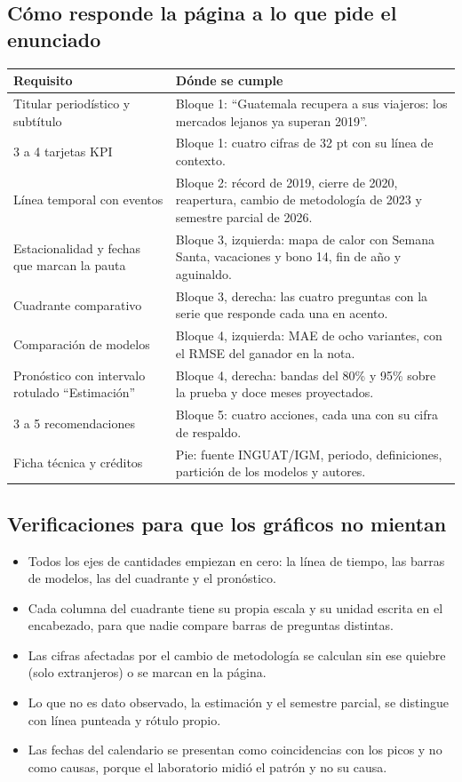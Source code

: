 \subsection{Cómo responde la página a lo que pide el enunciado}

\begin{center}
\begin{tabularx}{\textwidth}{@{}lX@{}}
\toprule
Requisito & Dónde se cumple \\
\midrule
Titular periodístico y subtítulo & Bloque 1: ``Guatemala recupera a sus viajeros: los
mercados lejanos ya superan 2019''. \\
3 a 4 tarjetas KPI & Bloque 1: cuatro cifras de 32 pt con su línea de contexto. \\
Línea temporal con eventos & Bloque 2: récord de 2019, cierre de 2020, reapertura,
cambio de metodología de 2023 y semestre parcial de 2026. \\
Estacionalidad y fechas que marcan la pauta & Bloque 3, izquierda: mapa de calor con
Semana Santa, vacaciones y bono 14, fin de año y aguinaldo. \\
Cuadrante comparativo & Bloque 3, derecha: las cuatro preguntas con la serie que
responde cada una en acento. \\
Comparación de modelos & Bloque 4, izquierda: MAE de ocho variantes, con el RMSE del
ganador en la nota. \\
Pronóstico con intervalo rotulado ``Estimación'' & Bloque 4, derecha: bandas del 80\% y
95\% sobre la prueba y doce meses proyectados. \\
3 a 5 recomendaciones & Bloque 5: cuatro acciones, cada una con su cifra de respaldo. \\
Ficha técnica y créditos & Pie: fuente INGUAT/IGM, periodo, definiciones, partición de
los modelos y autores. \\
\bottomrule
\end{tabularx}
\end{center}

\subsection{Verificaciones para que los gráficos no mientan}

\begin{itemize}[leftmargin=*]
  \item Todos los ejes de cantidades empiezan en cero: la línea de tiempo, las
  barras de modelos, las del cuadrante y el pronóstico.
  \item Cada columna del cuadrante tiene su propia escala y su unidad escrita en
  el encabezado, para que nadie compare barras de preguntas distintas.
  \item Las cifras afectadas por el cambio de metodología se calculan sin ese
  quiebre (solo extranjeros) o se marcan en la página.
  \item Lo que no es dato observado, la estimación y el semestre parcial, se
  distingue con línea punteada y rótulo propio.
  \item Las fechas del calendario se presentan como coincidencias con los picos y
  no como causas, porque el laboratorio midió el patrón y no su causa.
\end{itemize}

